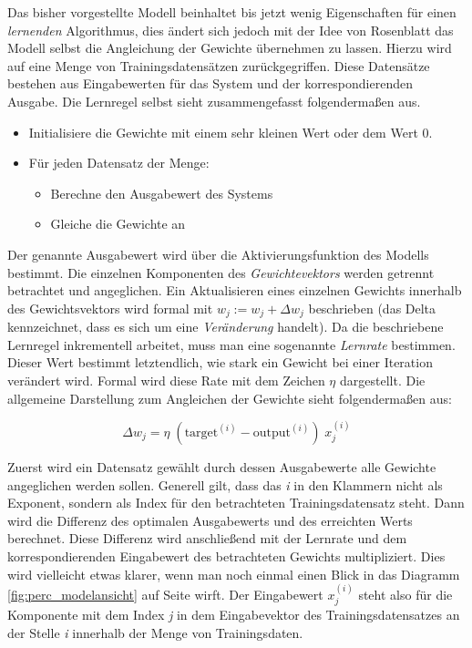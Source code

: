 Das bisher vorgestellte Modell beinhaltet bis jetzt wenig Eigenschaften für einen \emph{lernenden} Algorithmus, dies ändert sich jedoch mit der Idee von Rosenblatt das Modell selbst die Angleichung der Gewichte übernehmen zu lassen. Hierzu wird auf eine Menge von Trainingsdatensätzen zurückgegriffen.
Diese Datensätze bestehen aus Eingabewerten für das System und der korrespondierenden Ausgabe. Die Lernregel selbst sieht zusammengefasst folgendermaßen aus.

\vspace{4mm}
\begin{minipage}{\textwidth}
\begin{itemize}
\item Initialisiere die Gewichte mit einem sehr kleinen Wert oder dem Wert 0.
\item Für jeden Datensatz der Menge:
\begin{itemize}
	\item Berechne den Ausgabewert des Systems
	\item Gleiche die Gewichte an
\end{itemize}
\end{itemize}
\end{minipage}

\vspace{5 mm}

\label{sp:lernrate}
Der genannte Ausgabewert wird über die Aktivierungsfunktion des Modells bestimmt. Die einzelnen Komponenten des \emph{Gewichtevektors} werden getrennt betrachtet und angeglichen. Ein Aktualisieren eines einzelnen Gewichts innerhalb des Gewichtsvektors wird formal mit $w_j := w_j + \Delta w_j$ beschrieben (das Delta kennzeichnet, dass es sich um eine \emph{Veränderung} handelt). Da die beschriebene Lernregel inkrementell arbeitet, muss man eine sogenannte \emph{Lernrate} bestimmen. Dieser Wert bestimmt letztendlich, wie stark ein Gewicht bei einer Iteration verändert wird. Formal wird diese Rate mit dem Zeichen $\eta$ dargestellt. Die allgemeine Darstellung zum Angleichen der Gewichte sieht folgendermaßen aus:

\begin{equation} \label{eq:lernRegel}
\Delta w_j = \eta \; (\text{target}^{(i)} - \text{output}^{(i)})\;x^{(i)}_{j}
\end{equation}

Zuerst wird ein Datensatz gewählt durch dessen Ausgabewerte alle Gewichte angeglichen werden sollen. Generell gilt, dass das \emph{i} in den Klammern nicht als Exponent, sondern als Index für den betrachteten Trainingsdatensatz steht. Dann wird die Differenz des optimalen Ausgabewerts und des erreichten Werts berechnet. Diese Differenz wird anschließend mit der Lernrate und dem korrespondierenden Eingabewert des betrachteten Gewichts multipliziert. Dies wird vielleicht etwas klarer, wenn man noch einmal einen Blick in das Diagramm \ref{fig:perc_modelansicht} auf Seite \pageref{fig:perc_modelansicht} wirft. Der Eingabewert $x^{(i)}_{j}$ steht also für die Komponente mit dem Index \emph{j} in dem Eingabevektor des Trainingsdatensatzes an der Stelle \emph{i} innerhalb der Menge von Trainingsdaten.


